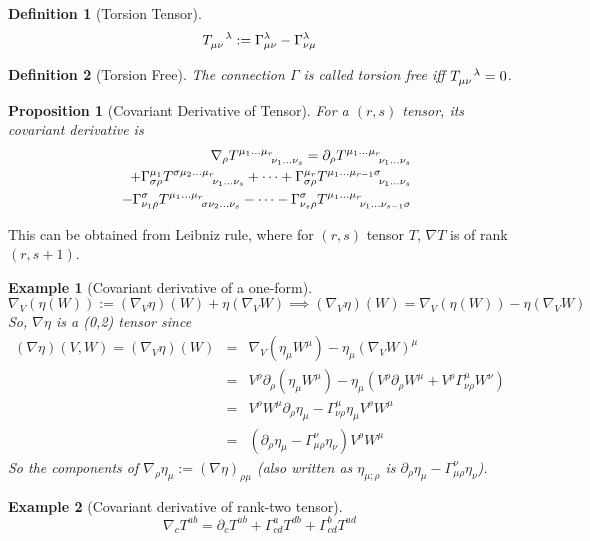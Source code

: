\documentclass[a4paper]{article}
\newtheorem{eg}{Example}[section]
\theoremstyle{new}
\newtheorem{defi}{Definition}[section]
\newtheorem{prop}{Proposition}[section]
\begin{document}
\begin{defi}[Torsion Tensor]
$$\tensor*{T}{*^{}_{\mu\nu}^{\lambda}}:=\Gamma_{\mu\nu}^\lambda-\Gamma_{\nu\mu}^\lambda$$
\end{defi}
\begin{defi}[Torsion Free]
The connection $\Gamma$ is called torsion free iff $\tensor*{T}{*^{}_{\mu\nu}^{\lambda}}=0$.
\end{defi}
\begin{prop}[Covariant Derivative of Tensor]
For a $(r,s)$ tensor, its covariant derivative is
\begin{eqnarray}
&&\nabla_\rho\tensor*{T}{*_{}^{\mu_1\dots \mu_r}_{\nu_1\dots \nu_s}}=\partial_\rho\tensor*{T}{*_{}^{\mu_1\dots \mu_r}_{\nu_1\dots \nu_s}}\nonumber\\&&+\Gamma^{\mu_1}_{\sigma\rho}\tensor*{T}{*_{}^{\sigma\mu_2\dots \mu_r}_{\nu_1\dots \nu_s}}+\dots +\Gamma_{\sigma\rho}^{\mu_r}\tensor*{T}{*_{}^{\mu_1\dots \mu_{r-1}\sigma}_{\nu_1\dots \nu_s}}\nonumber\\&&-\Gamma_{\nu_1\rho}^\sigma \tensor*{T}{*_{}^{\mu_1\dots \mu_r}_{\sigma\nu_2\dots \nu_s}}-\dots -\Gamma_{\nu_s\rho}^\sigma \tensor*{T}{*_{}^{\mu_1\dots \mu_r}_{\nu_1\dots \nu_{s-1}\sigma}}\label{covderivtensor}
\end{eqnarray}
\end{prop}
This can be obtained from Leibniz rule, where for $(r,s)$ tensor $T$, $\nabla T$ is of rank $(r,s+1)$.
\begin{eg}[Covariant derivative of a one-form]
$$\nabla_V(\eta(W)):=(\nabla_V\eta)(W)+\eta(\nabla_VW)\implies (\nabla_V\eta)(W)=\nabla_V(\eta(W))-\eta(\nabla_VW)$$
So, $\nabla\eta$ is a (0,2) tensor since
\begin{eqnarray}
(\nabla\eta)(V,W)=(\nabla_V\eta)(W)&=&\nabla_V(\eta_\mu W^\mu)-\eta_\mu(\nabla_VW)^\mu\nonumber\\&=&V^\rho\partial_\rho(\eta_\mu W^\mu)-\eta_\mu(V^\rho\partial_\rho W^\mu+V^\rho\Gamma_{\nu\rho}^\mu W^\nu)\nonumber\\&=&V^\rho W^\mu\partial_\rho\eta_\mu-\Gamma_{\nu\rho}^\mu\eta_\mu V^\rho W^\mu\nonumber\\&=&(\partial_\rho\eta_\mu-\Gamma_{\mu\rho}^\nu\eta_\nu)V^\rho W^\mu\label{covderivoneform}
\end{eqnarray}
So the components of $\nabla_\rho\eta_\mu:=(\nabla\eta)_{\rho\mu}$ (also written as $\eta_{\mu;\rho}$ is $\partial_\rho\eta_\mu-\Gamma_{\mu\rho}^\nu\eta_\nu$).
\end{eg}
\begin{eg}[Covariant derivative of rank-two tensor]
$$\nabla_cT^{ab}=\partial_cT^{ab}+\Gamma^a_{cd}T^{db}+\Gamma^b_{cd}T^{ad}$$
\end{eg}
\end{document}
